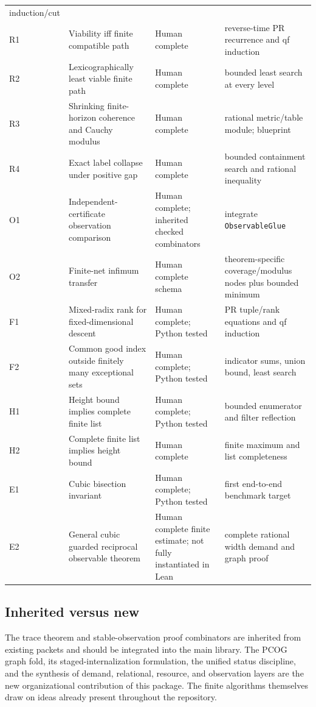 \begin{longtable}{@{}L{0.07\textwidth}L{0.35\textwidth}L{0.19\textwidth}L{0.31\textwidth}@{}}
induction/cut \\
R1 & Viability iff finite compatible path & Human complete & reverse-time PR
recurrence and qf induction \\
R2 & Lexicographically least viable finite path & Human complete & bounded
least search at every level \\
R3 & Shrinking finite-horizon coherence and Cauchy modulus & Human complete &
rational metric/table module; blueprint \\
R4 & Exact label collapse under positive gap & Human complete & bounded
containment search and rational inequality \\
O1 & Independent-certificate observation comparison & Human complete; inherited
checked combinators & integrate \texttt{ObservableGlue} \\
O2 & Finite-net infimum transfer & Human complete schema & theorem-specific
coverage/modulus nodes plus bounded minimum \\
F1 & Mixed-radix rank for fixed-dimensional descent & Human complete; Python
tested & PR tuple/rank equations and qf induction \\
F2 & Common good index outside finitely many exceptional sets & Human complete;
Python tested & indicator sums, union bound, least search \\
H1 & Height bound implies complete finite list & Human complete; Python tested &
bounded enumerator and filter reflection \\
H2 & Complete finite list implies height bound & Human complete & finite maximum
and list completeness \\
E1 & Cubic bisection invariant & Human complete; Python tested & first end-to-end
benchmark target \\
E2 & General cubic guarded reciprocal observable theorem & Human complete
finite estimate; not fully instantiated in Lean & complete rational
width demand and graph proof \\
\bottomrule
\end{longtable}

\subsection*{Inherited versus new}

The trace theorem and stable-observation proof combinators are inherited from
existing packets and should be integrated into the main library.  The PCOG
graph fold, its staged-internalization formulation, the unified status
discipline, and the synthesis of demand, relational, resource, and observation
layers are the new organizational contribution of this package.  The finite
algorithms themselves draw on ideas already present throughout the repository.

